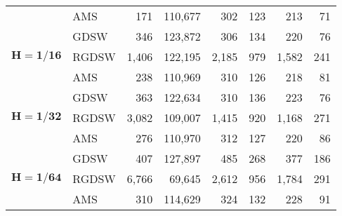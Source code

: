 \begin{table}[H]
\begin{tabular}{llrrrrrr}
\cline{2-8}
 & AMS & 171 & {\cellcolor[HTML]{C1D2F8}} \color[HTML]{000000} 110,677 & {\cellcolor[HTML]{9FC0F4}} \color[HTML]{000000} 302 & {\cellcolor[HTML]{945357}} \color[HTML]{F1F1F1} 123 & {\cellcolor[HTML]{7EAFF1}} \color[HTML]{000000} 213 & 71 \\
\cline{1-8} \cline{2-8}
\multirow[c]{3}{*}{$\mathbf{H=1/16}$} & GDSW & 346 & {\cellcolor[HTML]{7EAFF1}} \color[HTML]{000000} 123,872 & {\cellcolor[HTML]{945357}} \color[HTML]{F1F1F1} 306 & {\cellcolor[HTML]{C8B4C4}} \color[HTML]{000000} 134 & {\cellcolor[HTML]{AE838D}} \color[HTML]{F1F1F1} 220 & 76 \\
\cline{2-8}
 & RGDSW & 1,406 & {\cellcolor[HTML]{C1D2F8}} \color[HTML]{000000} 122,195 & {\cellcolor[HTML]{9FC0F4}} \color[HTML]{000000} 2,185 & {\cellcolor[HTML]{945357}} \color[HTML]{F1F1F1} 979 & {\cellcolor[HTML]{7EAFF1}} \color[HTML]{000000} 1,582 & 241 \\
\cline{2-8}
 & AMS & 238 & {\cellcolor[HTML]{AFC9F6}} \color[HTML]{000000} 110,969 & {\cellcolor[HTML]{7EAFF1}} \color[HTML]{000000} 310 & {\cellcolor[HTML]{BB9CA9}} \color[HTML]{F1F1F1} 126 & {\cellcolor[HTML]{945357}} \color[HTML]{F1F1F1} 218 & 81 \\
\cline{1-8} \cline{2-8}
\multirow[c]{3}{*}{$\mathbf{H=1/32}$} & GDSW & 363 & {\cellcolor[HTML]{7EAFF1}} \color[HTML]{000000} 122,634 & {\cellcolor[HTML]{945357}} \color[HTML]{F1F1F1} 310 & {\cellcolor[HTML]{C8B4C4}} \color[HTML]{000000} 136 & {\cellcolor[HTML]{AE838D}} \color[HTML]{F1F1F1} 223 & 76 \\
\cline{2-8}
 & RGDSW & 3,082 & {\cellcolor[HTML]{7EAFF1}} \color[HTML]{000000} 109,007 & {\cellcolor[HTML]{945357}} \color[HTML]{F1F1F1} 1,415 & {\cellcolor[HTML]{C8B4C4}} \color[HTML]{000000} 920 & {\cellcolor[HTML]{AE838D}} \color[HTML]{F1F1F1} 1,168 & 271 \\
\cline{2-8}
 & AMS & 276 & {\cellcolor[HTML]{AFC9F6}} \color[HTML]{000000} 110,970 & {\cellcolor[HTML]{7EAFF1}} \color[HTML]{000000} 312 & {\cellcolor[HTML]{BB9CA9}} \color[HTML]{F1F1F1} 127 & {\cellcolor[HTML]{945357}} \color[HTML]{F1F1F1} 220 & 86 \\
\cline{1-8} \cline{2-8}
\multirow[c]{3}{*}{$\mathbf{H=1/64}$} & GDSW & 407 & {\cellcolor[HTML]{AFC9F6}} \color[HTML]{000000} 127,897 & {\cellcolor[HTML]{7EAFF1}} \color[HTML]{000000} 485 & {\cellcolor[HTML]{BB9CA9}} \color[HTML]{F1F1F1} 268 & {\cellcolor[HTML]{945357}} \color[HTML]{F1F1F1} 377 & 186 \\
\cline{2-8}
 & RGDSW & 6,766 & {\cellcolor[HTML]{7EAFF1}} \color[HTML]{000000} 69,645 & {\cellcolor[HTML]{945357}} \color[HTML]{F1F1F1} 2,612 & {\cellcolor[HTML]{C8B4C4}} \color[HTML]{000000} 956 & {\cellcolor[HTML]{AE838D}} \color[HTML]{F1F1F1} 1,784 & 291 \\
\cline{2-8}
 & AMS & 310 & {\cellcolor[HTML]{AFC9F6}} \color[HTML]{000000} 114,629 & {\cellcolor[HTML]{7EAFF1}} \color[HTML]{000000} 324 & {\cellcolor[HTML]{BB9CA9}} \color[HTML]{F1F1F1} 132 & {\cellcolor[HTML]{945357}} \color[HTML]{F1F1F1} 228 & 91 \\
\cline{1-8} \cline{2-8}
\bottomrule
\end{tabular}
\end{table}
